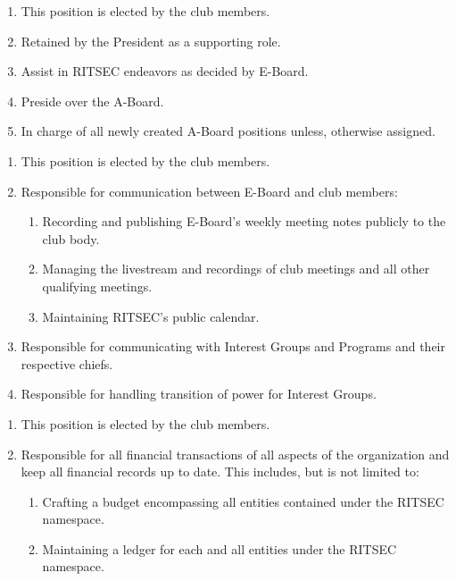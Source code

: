 
\begin{enumerate}
  \item This position is elected by the club members.
  \item Retained by the President as a supporting role.
  \item Assist in RITSEC endeavors as decided by E-Board.
  \item Preside over the A-Board.
  \item In charge of all newly created A-Board positions unless, otherwise assigned.
\end{enumerate}


\begin{enumerate}
  \item This position is elected by the club members.
  \item Responsible for communication between E-Board and club members:
  \begin{enumerate}
    \item Recording and publishing E-Board's weekly meeting notes publicly to the club body.
    \item Managing the livestream and recordings of club meetings and all other qualifying meetings. 
    \item Maintaining RITSEC's public calendar.
  \end{enumerate}
  \item Responsible for communicating with Interest Groups and Programs and their respective chiefs.
  \item Responsible for handling transition of power for Interest Groups.
\end{enumerate}


\begin{enumerate}
  \item This position is elected by the club members.
  \item Responsible for all financial transactions of all aspects of the organization and keep all financial records up to date. This includes, but is not limited to:
  \begin{enumerate} 
    \item Crafting a budget encompassing all entities contained under the RITSEC namespace.
    \item Maintaining a ledger for each and all entities under the RITSEC namespace.
  \end{enumerate}
\end{enumerate}

